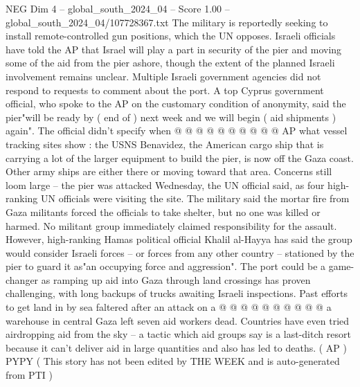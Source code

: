 \begin{textsample}{NEG Dim 4 – global\_south\_2024\_04 – Score 1.00 – global\_south\_2024\_04/107728367.txt}
The military is reportedly seeking to install remote-controlled gun positions, which the UN opposes.
Israeli officials have told the AP that Israel will play a part in security of the pier and moving some of the aid from the pier ashore, though the extent of the planned Israeli involvement remains unclear.
Multiple Israeli government agencies did not respond to requests to comment about the port.
A top Cyprus government official, who spoke to the AP on the customary condition of anonymity, said the pier"will be ready by ( end of ) next week and we will begin ( aid shipments ) again".
The official didn't specify when @ @ @ @ @ @ @ @ @ @ AP what vessel tracking sites show : the USNS Benavidez, the American cargo ship that is carrying a lot of the larger equipment to build the pier, is now off the Gaza coast.
Other army ships are either there or moving toward that area.
Concerns still loom large -- the pier was attacked Wednesday, the UN official said, as four high-ranking UN officials were visiting the site.
The military said the mortar fire from Gaza militants forced the officials to take shelter, but no one was killed or harmed.
No militant group immediately claimed responsibility for the assault.
However, high-ranking Hamas political official Khalil al-Hayya has said the group would consider Israeli forces -- or forces from any other country -- stationed by the pier to guard it as"an occupying force and aggression".
The port could be a game-changer as ramping up aid into Gaza through land crossings has proven challenging, with long backups of trucks awaiting Israeli inspections.
Past efforts to get land in by sea faltered after an attack on a @ @ @ @ @ @ @ @ @ @ a warehouse in central Gaza left seven aid workers dead.
Countries have even tried airdropping aid from the sky -- a tactic which aid groups say is a last-ditch resort because it can't deliver aid in large quantities and also has led to deaths. ( AP ) PYPY ( This story has not been edited by THE WEEK and is auto-generated from PTI )

\end{textsample}
